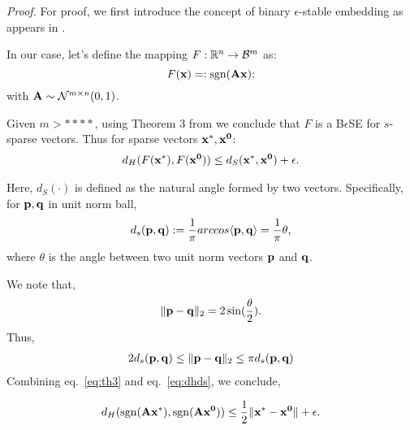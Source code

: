 \textit{Proof.} For proof, we first introduce the concept of binary $\epsilon$-stable embedding as appears in .
 
In our case, let's define the mapping $F: {\mathbb{R}}^n \rightarrow \mathcal{B}^m$  as:
$$
F(\mathbf{x})=: \mathrm{sgn}(\mathbf{Ax});
$$
with $\mathbf{A} \sim \mathcal{N}^{m \times n}(0,1)$.

Given $m > ****$, using Theorem 3 from  we conclude that $F$ is a B$\epsilon$SE for $s$-sparse vectors.
Thus for sparse vectors $\mathbf{x^*, x^0}$:
\begin{align}
\label{eq:th3}
d_H(F\mathbf{(x^*)},F\mathbf{(x^0)}) \leq d_S(\mathbf{x^*,x^0}) + \epsilon.
\end{align}

Here, $d_S(\cdot)$ is defined as the natural angle formed by two vectors. Specifically, for $\mathbf{p,q}$ in unit norm ball,
$$
d_s(\mathbf{p},\mathbf{q}) := \frac{1}{\pi}arccos\langle\mathbf{p},\mathbf{q}\rangle = \frac{1}{\pi}\theta,
$$
where $\theta$ is the angle between two unit norm vectors $\mathbf{p}$ and $\mathbf{q}$.

We note that,
$$
\|\mathbf{p-q}\|_2 = 2\sin(\frac{\theta}{2}).
$$
Thus,
\begin{align}
\label{eq:dhds}
2d_s(\mathbf{p},\mathbf{q}) \leq \|\mathbf{p - q}\|_2 \leq \pi d_s(\mathbf{p},\mathbf{q})
\end{align}
Combining eq.~\ref{eq:th3} and eq.~\ref{eq:dhds}, we conclude,

$$
d_H(\mathrm{sgn}({\mathbf{Ax^*}}), \mathrm{sgn}({\mathbf{Ax^0}})) \leq \frac{1}{2}\|\mathbf{x^*-x^0}\| + \epsilon.
$$

